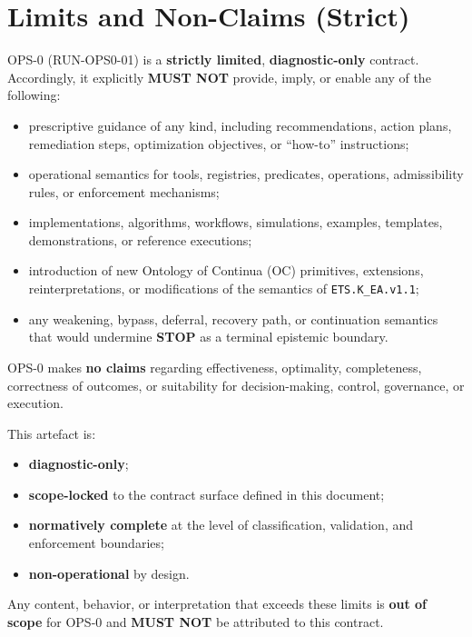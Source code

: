 ﻿\section{Limits and Non-Claims (Strict)}

OPS-0 (RUN-OPS0-01) is a \textbf{strictly limited}, \textbf{diagnostic-only} contract.
Accordingly, it explicitly \textbf{MUST NOT} provide, imply, or enable any of the following:

\begin{itemize}
  \item prescriptive guidance of any kind, including recommendations, action plans, remediation steps, optimization objectives, or ``how-to'' instructions;
  \item operational semantics for tools, registries, predicates, operations, admissibility rules, or enforcement mechanisms;
  \item implementations, algorithms, workflows, simulations, examples, templates, demonstrations, or reference executions;
  \item introduction of new Ontology of Continua (OC) primitives, extensions, reinterpretations, or modifications of the semantics of \texttt{ETS.K\_EA.v1.1};
  \item any weakening, bypass, deferral, recovery path, or continuation semantics that would undermine \textbf{STOP} as a terminal epistemic boundary.
\end{itemize}

OPS-0 makes \textbf{no claims} regarding effectiveness, optimality, completeness, correctness of outcomes, or suitability for decision-making, control, governance, or execution.

This artefact is:
\begin{itemize}
  \item \textbf{diagnostic-only};
  \item \textbf{scope-locked} to the contract surface defined in this document;
  \item \textbf{normatively complete} at the level of classification, validation, and enforcement boundaries;
  \item \textbf{non-operational} by design.
\end{itemize}

Any content, behavior, or interpretation that exceeds these limits is \textbf{out of scope} for OPS-0 and \textbf{MUST NOT} be attributed to this contract.
